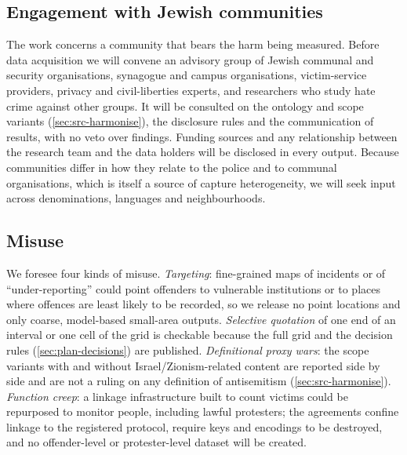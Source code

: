 \subsection{Engagement with Jewish communities}\label{sec:ethics-community}

The work concerns a community that bears the harm being measured. Before data acquisition we will convene an advisory group of Jewish communal and security organisations, synagogue and campus organisations, victim-service providers, privacy and civil-liberties experts, and researchers who study hate crime against other groups. It will be consulted on the ontology and scope variants (\cref{sec:src-harmonise}), the disclosure rules and the communication of results, with no veto over findings. Funding sources and any relationship between the research team and the data holders will be disclosed in every output. Because communities differ in how they relate to the police and to communal organisations, which is itself a source of capture heterogeneity, we will seek input across denominations, languages and neighbourhoods.

\subsection{Misuse}\label{sec:ethics-misuse}

We foresee four kinds of misuse. \emph{Targeting}: fine-grained maps of incidents or of ``under-reporting'' could point offenders to vulnerable institutions or to places where offences are least likely to be recorded, so we release no point locations and only coarse, model-based small-area outputs. \emph{Selective quotation} of one end of an interval or one cell of the grid is checkable because the full grid and the decision rules (\cref{sec:plan-decisions}) are published. \emph{Definitional proxy wars}: the scope variants with and without Israel/Zionism-related content are reported side by side and are not a ruling on any definition of antisemitism (\cref{sec:src-harmonise}). \emph{Function creep}: a linkage infrastructure built to count victims could be repurposed to monitor people, including lawful protesters; the agreements confine linkage to the registered protocol, require keys and encodings to be destroyed, and no offender-level or protester-level dataset will be created.
